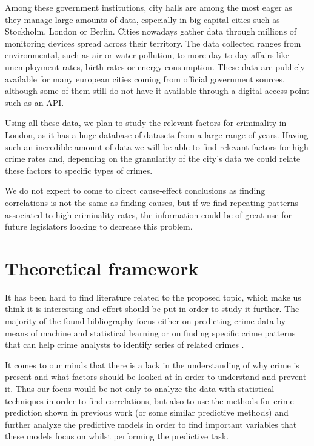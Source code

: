 \documentclass[12pt, openany]{report}
\begin{document}
Among these government institutions, city halls are among the most eager as they manage large amounts of data, especially in big capital cities such as Stockholm, London or Berlin. Cities nowadays gather data  through millions of monitoring devices spread across their territory. The data collected ranges from environmental, such as air or water pollution, to more day-to-day affairs like unemployment rates, birth rates or energy consumption. These data are publicly available for many european cities coming from official government sources, although some of them still do not have it available through a digital access point such as an API.

Using all these data, we plan to study the relevant factors for criminality in London, as it has a huge database of datasets from a large range of years. Having such an incredible amount of data we will be able to find relevant factors for high crime rates and, depending on the granularity of the city's data we could relate these factors to specific types of crimes.

We do not expect to come to direct cause-effect conclusions as finding correlations is not the same as finding causes, but if we find repeating patterns associated to high criminality rates, the information could be of great use for future legislators looking to decrease this problem.

\section{Theoretical framework}

It has been hard to find literature related to the proposed topic, which make us think it is interesting and effort should be put in order to study it further. The majority of the found bibliography focus either on predicting crime data by means of machine \cite{mcclendon15} and statistical learning \cite{berk09} or on finding specific crime patterns that can help crime analysts to identify series of related crimes \cite{wang13}.

It comes to our minds that there is a lack in the understanding of why crime is present and what factors should be looked at in order to understand and prevent it. Thus our focus would be not only to analyze the data with statistical techniques in order to find correlations, but also to use the methods for crime prediction shown in previous work \cite{powers11} (or some similar predictive methods) and further analyze the predictive models in order to find important variables that these models focus on whilst performing the predictive task.
\end{document}
